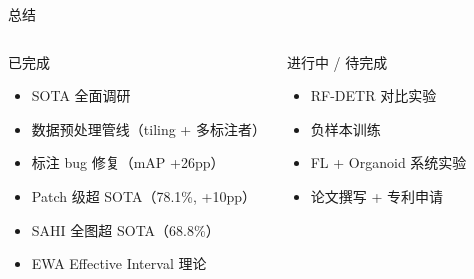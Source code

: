 \documentclass[aspectratio=169, 10pt]{beamer}
\begin{document}
\begin{frame}{总结}
  \begin{columns}[T]
    \begin{block}{已完成}
      \begin{itemize}
        \item[\checkmark] SOTA 全面调研
        \item[\checkmark] 数据预处理管线（tiling + 多标注者）
        \item[\checkmark] 标注 bug 修复（mAP +26pp）
        \item[\checkmark] Patch 级超 SOTA（78.1\%, +10pp）
        \item[\checkmark] SAHI 全图超 SOTA（68.8\%）
        \item[\checkmark] EWA Effective Interval 理论
      \end{itemize}
    \end{block}
    \begin{block}{进行中 / 待完成}
      \begin{itemize}
        \item[$\circ$] RF-DETR 对比实验
        \item[$\circ$] 负样本训练
        \item[$\circ$] FL + Organoid 系统实验
        \item[$\circ$] 论文撰写 + 专利申请
      \end{itemize}
    \end{block}
  \end{columns}
\end{frame}
\end{document}
